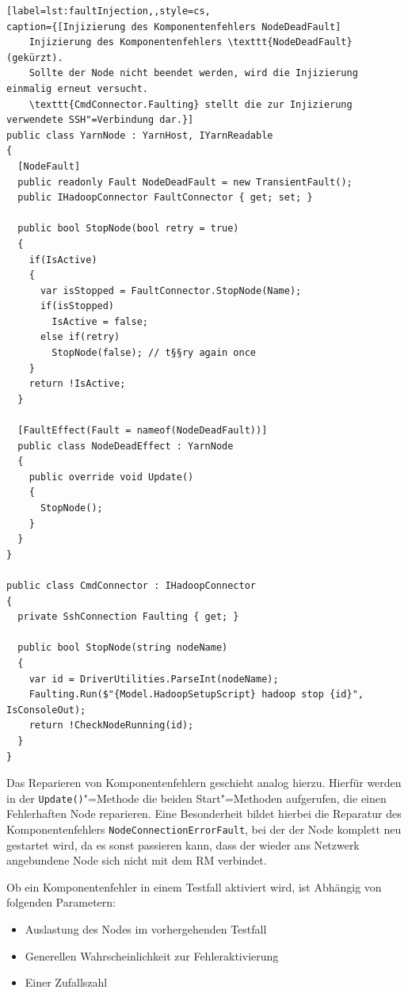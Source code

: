 \begin{lstlisting}[label=lst:faultInjection,,style=cs,
caption={[Injizierung des Komponentenfehlers NodeDeadFault]
    Injizierung des Komponentenfehlers \texttt{NodeDeadFault} (gekürzt).
    Sollte der Node nicht beendet werden, wird die Injizierung einmalig erneut versucht.
    \texttt{CmdConnector.Faulting} stellt die zur Injizierung verwendete SSH"=Verbindung dar.}]
public class YarnNode : YarnHost, IYarnReadable
{
  [NodeFault]
  public readonly Fault NodeDeadFault = new TransientFault();
  public IHadoopConnector FaultConnector { get; set; }
  
  public bool StopNode(bool retry = true)
  {
    if(IsActive)
    {
      var isStopped = FaultConnector.StopNode(Name);
      if(isStopped)
        IsActive = false;
      else if(retry)
        StopNode(false); // t§§ry again once
    }
    return !IsActive;
  }
  
  [FaultEffect(Fault = nameof(NodeDeadFault))]
  public class NodeDeadEffect : YarnNode
  {
    public override void Update()
    {
      StopNode();
    }
  }
}

public class CmdConnector : IHadoopConnector
{
  private SshConnection Faulting { get; }
  
  public bool StopNode(string nodeName)
  {
    var id = DriverUtilities.ParseInt(nodeName);
    Faulting.Run($"{Model.HadoopSetupScript} hadoop stop {id}", IsConsoleOut);
    return !CheckNodeRunning(id);
  }
}
\end{lstlisting}

Das Reparieren von Komponentenfehlern geschieht analog hierzu.
Hierfür werden in der \texttt{Update()}"=Methode die beiden Start"=Methoden aufgerufen, die einen Fehlerhaften Node reparieren.
Eine Besonderheit bildet hierbei die Reparatur des Komponentenfehlers \texttt{NodeConnectionErrorFault}, bei der der Node komplett neu gestartet wird, da es sonst passieren kann, dass der wieder ans Netzwerk angebundene Node sich nicht mit dem \ac{RM} verbindet.

Ob ein Komponentenfehler in einem Testfall aktiviert wird, ist Abhängig von folgenden Parametern:

\begin{itemize}
    \item Auslastung des Nodes im vorhergehenden Testfall
    \item Generellen Wahrscheinlichkeit zur Fehleraktivierung
    \item Einer Zufallszahl
\end{itemize}


